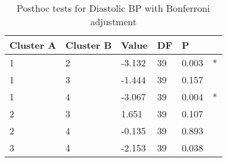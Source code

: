 \begin{table}[h]
\caption{Posthoc tests for Diastolic BP with Bonferroni adjustment}
\label{tab:posthoc_Diastolic_BP}
\begin{tabular}{llllll}
\toprule
Cluster A & Cluster B & Value & DF & P &   \\
\midrule
1 & 2 & -3.132 & 39 & 0.003 & * \\
1 & 3 & -1.444 & 39 & 0.157 &   \\
1 & 4 & -3.067 & 39 & 0.004 & * \\
2 & 3 & 1.651 & 39 & 0.107 &   \\
2 & 4 & -0.135 & 39 & 0.893 &   \\
3 & 4 & -2.153 & 39 & 0.038 &   \\
\bottomrule
\end{tabular}
\end{table}
